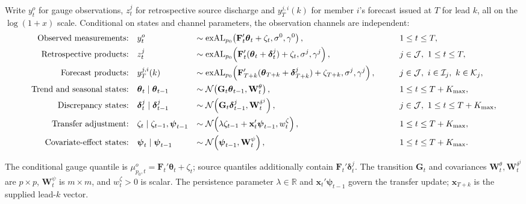 \documentclass[APA,STIX1COL]{WileyNJD-v2}
\begin{document}
Write $y_t^o$ for gauge observations, $z_t^j$ for retrospective source discharge and $y_T^{j,i}(k)$ for member $i$'s forecast issued at $T$ for lead $k$, all on the $\log(1+x)$ scale. Conditional on states and channel parameters, the observation channels are independent:
\begin{alignat}{3}
\text{Observed measurements:}\quad&
y_t^o
&\sim{}& \text{exAL}_{p_0}\!\left(\mathbf{F}_t' \boldsymbol{\theta}_t + \zeta_t, \sigma^0, \gamma^0\right),
&\qquad& 1 \le t \le T, \label{eq:unified_usgs}
\\
\text{Retrospective products:}\quad&
z_t^j
&\sim{}& \text{exAL}_{p_0}\!\left(\mathbf{F}_t'(\boldsymbol{\theta}_t + \boldsymbol{\delta}_t^j) + \zeta_t, \sigma^j, \gamma^j\right),
&\qquad& j \in \mathcal{J},\ 1 \le t \le T, \label{eq:unified_retro}
\\
\text{Forecast products:}\quad&
y_T^{j,i}(k)
&\sim{}& \text{exAL}_{p_0}\!\left(\mathbf{F}_{T+k}'(\boldsymbol{\theta}_{T+k} + \boldsymbol{\delta}_{T+k}^j) + \zeta_{T+k}, \sigma^j, \gamma^j\right),
&\qquad& j \in \mathcal{J},\ i \in \mathcal{I}_j,\ k \in \mathcal{K}_j, \notag
\\
\text{Trend and seasonal states:}\quad&
\boldsymbol{\theta}_t \mid \boldsymbol{\theta}_{t-1}
&\sim{}& \mathcal{N}\!\left(\mathbf{G}_t \boldsymbol{\theta}_{t-1}, \mathbf{W}_t^\theta\right),
&\qquad& 1 \le t \le T+K_{\max}, \label{eq:unified_theta}
\\
\text{Discrepancy states:}\quad&
\boldsymbol{\delta}_t^j \mid \boldsymbol{\delta}_{t-1}^j
&\sim{}& \mathcal{N}\!\left(\mathbf{G}_t \boldsymbol{\delta}_{t-1}^j, \mathbf{W}_t^{\delta^j}\right),
&\qquad& j \in \mathcal{J},\ 1 \le t \le T+K_{\max}, \label{eq:unified_delta}
\\
\text{Transfer adjustment:}\quad&
\zeta_t \mid \zeta_{t-1}, \boldsymbol{\psi}_{t-1}
&\sim{}& \mathcal{N}\!\left(\lambda \zeta_{t-1} + \mathbf{x}_t'\boldsymbol{\psi}_{t-1}, w_t^\zeta\right),
&\qquad& 1 \le t \le T+K_{\max}, \label{eq:unified_transfer}
\\
\text{Covariate-effect states:}\quad&
\boldsymbol{\psi}_t \mid \boldsymbol{\psi}_{t-1}
&\sim{}& \mathcal{N}\!\left(\boldsymbol{\psi}_{t-1}, \mathbf{W}_t^\psi\right),
&\qquad& 1 \le t \le T+K_{\max}. \notag
\end{alignat}

The conditional gauge quantile is $\mu^o_{p_0,t}=\mathbf F_t'\boldsymbol\theta_t+\zeta_t$; source quantiles additionally contain $\mathbf F_t'\boldsymbol\delta_t^j$. The transition $\mathbf G_t$ and covariances $\mathbf W_t^\theta,\mathbf W_t^{\delta^j}$ are $p\times p$, $\mathbf W_t^\psi$ is $m\times m$, and $w_t^\zeta>0$ is scalar. The persistence parameter $\lambda\in\mathbb R$ and $\mathbf x_t'\boldsymbol\psi_{t-1}$ govern the transfer update; $\mathbf x_{T+k}$ is the supplied lead-$k$ vector.
\end{document}

